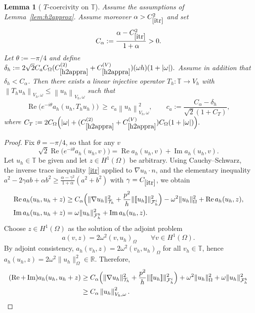 \documentclass[11pt]{article}
\theoremstyle{definition}
\theoremstyle{plain}
\newtheorem{lemma}[theorem]{Lemma}
\newcommand{\Ca}{C_a}
\newcommand{\ca}{c_a}
\newcommand{\const}[1]{C_{\eqref{#1}}}
\newcommand{\dgonorm}[1]{\norm{#1}_{V_h,\omega}}
\newcommand{\jmp}[1]{[\![ #1 ]\!]}
\newcommand{\dom}{\Omega}
\newcommand{\Th}{{\calT_h}}
\newcommand{\Fhi}{{\calF_h^i}}
\newcommand{\Fhb}{{\calF_h^b}}
\renewcommand{\Re}{\operatorname{Re}}
\renewcommand{\Im}{\operatorname{Im}}
\newcommand*{\norm}[1]{\left\|#1\right\|}
\newcommand{\ITh}{\mathbb{T}}
\newcommand{\calF}{\mathcal{F}}
\newcommand{\calT}{\mathcal{T}}
\begin{document}
\begin{lemma}[ $T$-coercivity on $\ITh$]\label{lem:Tcoercive}
Assume the assumptions of Lemma~\ref{lem:h2approx}.
Assume moreover $\alpha>\const{itr}^2$ and set
\[
C_\alpha:=\frac{\alpha-\const{itr}^2}{1+\alpha}>0.
\]
Let $\theta:=-\pi/4$ and define
$
\delta_h:=2\sqrt2 \Ca C_\dom (\const{h2appra}^{(2)}+\const{h2appra}^{(V)}) (\omega h) (1+|\omega|).
$
Assume in addition that $\delta_h<C_\alpha$.
Then there exists a linear injective operator $T_h:\ITh\to V_h$ with
$\dgonorm{T_hu_h}\le \dgonorm{u_h}$ such that
\[
\Re\bigl(e^{-i\theta}a_h(u_h,T_h u_h)\bigr)\ \ge\ \ca \dgonorm{u_h}^2,
\qquad
\ca:=\frac{C_\alpha-\delta_h}{\sqrt2(1+C_T)},
\]
where
$
C_T:=2C_\dom\Bigl(|\omega|+(\const{h2appra}^{(2)}+\const{h2appra}^{(V)}) C_\Omega(1+|\omega|)\Bigr).
$
\end{lemma}
\begin{proof}
Fix $\theta=-\pi/4$, so that for any $v$
\begin{equation}\label{eq:phase_id}
\sqrt2 \Re\bigl(e^{-i\theta}a_h(u_h,v)\bigr)=\Re a_h(u_h,v)+\Im a_h(u_h,v).
\end{equation}
Let $u_h\in\ITh$ be given and let $z\in H^1(\Omega)$ be arbitrary. Using Cauchy--Schwarz,
the inverse trace inequality \eqref{itr} applied to $\nabla u_h\cdot n$, and the elementary inequality
$a^2-2\gamma ab+\alpha b^2\ge\frac{\alpha-\gamma^2}{1+\alpha}(a^2+b^2)$ with $\gamma=\const{itr}$, we obtain
\begin{align*}
\Re a_h(u_h,u_h+z)
&\ge
C_\alpha\Bigl(\|\nabla u_h\|_\Th^2+\frac{p^2}{h}\|\jmp{u_h}\|_{\Fhi}^2\Bigr)
-\omega^2\|u_h\|_\Omega^2
+\Re a_h(u_h,z),
\\
\Im a_h(u_h,u_h+z)&=\omega\|u_h\|_{\Fhb}^2+\Im a_h(u_h,z).
\end{align*}
Choose $z\in H^1(\Omega)$ as the solution of the adjoint problem
\begin{equation}\label{eq:z_adj}
a(v,z)=2\omega^2 (v,u_h)_\Omega \qquad \forall v\in H^1(\Omega).
\end{equation}
By adjoint consistency, $a_h(v_h,z)=2\omega^2(v_h,u_h)_\Omega$ for all $v_h\in\ITh$, hence
$a_h(u_h,z)=2\omega^2\|u_h\|_\Omega^2\in\mathbb R$. Therefore,
\begin{align}
(\Re+\Im)a_h(u_h,u_h+z)
&\ge
C_\alpha\Bigl(\|\nabla u_h\|_\Th^2+\frac{p^2}{h}\|\jmp{u_h}\|_{\Fhi}^2\Bigr)
+\omega^2\|u_h\|_\Omega^2
+\omega\|u_h\|_{\Fhb}^2
\nonumber\\
&\ge C_\alpha \dgonorm{u_h}^2. \label{eq:baseline}
\end{align}


\end{proof}
\end{document}
